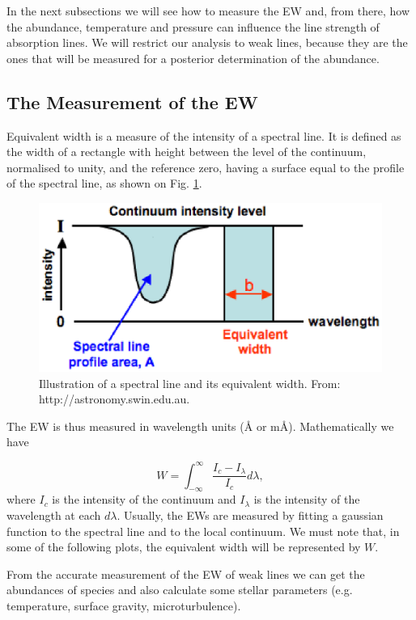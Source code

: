 \documentclass[dvips,12pt,a4paper]{report}
\begin{document}
{In the next subsections we will see how to measure the EW and, from there, how the abundance, temperature and pressure can influence the line strength of absorption lines. We will restrict our analysis to weak lines, because they are the ones that will be measured for a posterior determination of the abundance.

\subsection{The Measurement of the EW}

Equivalent width is a measure of the intensity of a spectral line. It is defined as the width of a rectangle with height between the level of the continuum, normalised to unity, and the reference zero, having a surface equal to the profile of the spectral line, as shown on Fig. \ref{ew}.

\begin{figure}[h]
\centering
\includegraphics[height=5 cm]{pics/equivalent_width}
\caption{Illustration of a spectral line and its equivalent width. From: http://astronomy.swin.edu.au.}
\label{ew}
\end{figure}

The EW is thus measured in wavelength units (\AA{}  or m\AA). Mathematically we have

\begin{equation}
 W=\int_{-\infty}^{\infty} \frac{I_c-I_\lambda}{I_c}d\lambda,
\end{equation}
where $I_c$ is the intensity of the continuum and $I_\lambda$ is the intensity of the wavelength at each $d\lambda$. Usually, the EWs are measured by fitting a gaussian function to the spectral line and to the local continuum. We must note that, in some of the following plots, the equivalent width will be represented by $W$.

From the accurate measurement of the EW of weak lines we can get the abundances of species and also calculate some stellar parameters (e.g. temperature, surface gravity, microturbulence).

}
\end{document}
